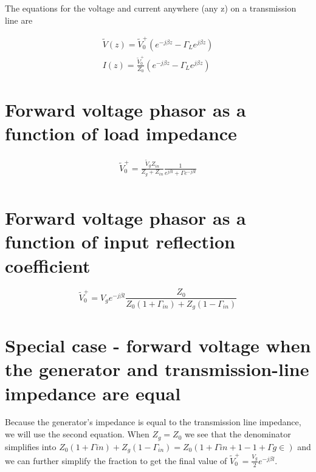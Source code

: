 \documentclass{ximera}
\begin{document}
\begin{explanation}

The equations for the voltage and current anywhere (any z) on a transmission line  are


\begin{eqnarray}
\tilde{V}(z)= \tilde{V}_0^+ (e^{-j \beta z} - \Gamma_L  e^{j \beta z }  ) \label{eq:vtlfin} \\
I(z)=   \frac{\tilde{V}_0^+}{Z_0}  (e^{-j \beta z} - \Gamma_L  e^{j \beta z}  ) \label{eq:itlfin}
\end{eqnarray}

\section{Forward voltage phasor as a function of load impedance}


\begin{eqnarray}
\tilde{V}_0^+= \frac{\tilde{V}_g Z_{in}}{Z_g + Z_{in}} \frac{1}{e^{j \beta l} + \Gamma e^{-j \beta l}} \\
\end{eqnarray}




\section{Forward voltage phasor as a function of input reflection coefficient}


\begin{equation}
\tilde{V}_0^+=V_g e^{-j \beta l} \frac{Z_0}{Z_0 (1+\Gamma_{in}) +Z_g (1-\Gamma_{in})}
\end{equation}

\section{Special case - forward voltage when the generator and transmission-line impedance are equal}

Because the generator's impedance is equal to the transmission line impedance, we will use the second equation. When $Z_g=Z_0$ we see that the denominator simplifies into $Z_0 (1+\Gamma{in}) +Z_g (1-\Gamma_{in}) = Z_0 (1+\Gamma{in}+1-1+\Gamma{g\in})$ and we can further simplify the fraction to get the final value of $\tilde{V}_0^+=\frac{V_g}{2} e^{-j \beta l}$. 





\end{explanation}
\end{document}
